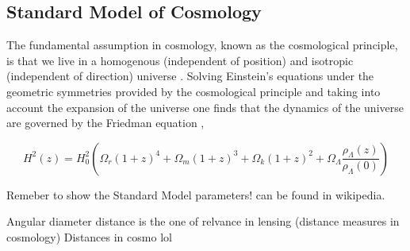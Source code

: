 
\subsection{Standard Model of Cosmology}

The fundamental assumption in cosmology, known as the cosmological principle, is that we live in a homogenous (independent of position) and isotropic (independent of direction) universe \cite{general_2013,ryden}. Solving Einstein's equations under the geometric symmetries provided by the cosmological principle and taking into account the expansion of the universe one finds that the dynamics of the universe are governed by the Friedman equation \cite{ryden,general_2013},

\begin{equation}
  H^2(z) = H_0^2 \left(\Omega_r (1+z)^4 + \Omega_m (1+z)^3 + \Omega_k (1+z)^2 + \Omega_\Lambda \frac{\rho_\Lambda(z)}{\rho_\Lambda(0)}\right)
  \label{eq:friedman}
\end{equation}


Remeber to show the Standard Model parameters! can be found in wikipedia.
\par Angular diameter distance is the one of relvance in lensing (distance measures in cosmology)
Distances in cosmo \cite{Hogg:1999ad}
lol  

